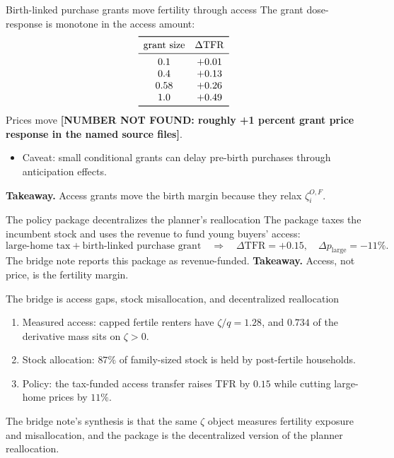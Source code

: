 \documentclass[aspectratio=169,10pt]{beamer}
\newcommand{\takeaway}[1]{\vfill{\footnotesize\textbf{Takeaway.} #1}}
\newcommand{\notfound}[1]{\textbf{[NUMBER NOT FOUND: #1]}}
\begin{document}
\begin{frame}{Birth-linked purchase grants move fertility through access}
  The grant dose-response is monotone in the access amount:
  \[
  \begin{array}{cc}
  \toprule
  \text{grant size} & \Delta \mathrm{TFR}\\
  \midrule
  0.1 & +0.01\\
  0.4 & +0.13\\
  0.58 & +0.26\\
  1.0 & +0.49\\
  \bottomrule
  \end{array}
  \]
  Prices move \notfound{roughly +1 percent grant price response in the named source files}.
  \begin{itemize}
    \item Caveat: small conditional grants can delay pre-birth purchases through anticipation effects.
  \end{itemize}
  \takeaway{Access grants move the birth margin because they relax \(\zeta_i^{O,F}\).}
\end{frame}

\begin{frame}{The policy package decentralizes the planner's reallocation}
  The package taxes the incumbent stock and uses the revenue to fund young buyers' access:
  \[
  \text{large-home tax}+\text{birth-linked purchase grant}
  \quad\Rightarrow\quad
  \Delta \mathrm{TFR}=+0.15,\quad
  \Delta p_{\text{large}}=-11\%.
  \]
  The bridge note reports this package as revenue-funded.
  \takeaway{Access, not price, is the fertility margin.}
\end{frame}

\begin{frame}{The bridge is access gaps, stock misallocation, and decentralized reallocation}
  \begin{enumerate}
    \item Measured access: capped fertile renters have \(\zeta/q=1.28\), and \(0.734\) of the derivative mass sits on \(\zeta>0\).
    \item Stock allocation: \(87\%\) of family-sized stock is held by post-fertile households.
    \item Policy: the tax-funded access transfer raises TFR by \(0.15\) while cutting large-home prices by \(11\%\).
  \end{enumerate}
  The bridge note's synthesis is that the same \(\zeta\) object measures fertility exposure and misallocation, and the package is the decentralized version of the planner reallocation.
\end{frame}
\end{document}
